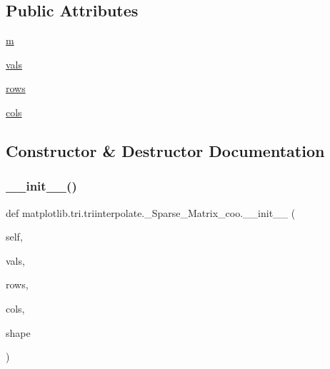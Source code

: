 \subsection*{Public Attributes}
\begin{DoxyCompactItemize}
\item 
\hyperlink{classmatplotlib_1_1tri_1_1triinterpolate_1_1__Sparse__Matrix__coo_aab07df69429ab594960f2091021c09a1}{m}
\item 
\hyperlink{classmatplotlib_1_1tri_1_1triinterpolate_1_1__Sparse__Matrix__coo_a5612eaa0dd35a3b3aa32e70b75caf87e}{vals}
\item 
\hyperlink{classmatplotlib_1_1tri_1_1triinterpolate_1_1__Sparse__Matrix__coo_ab6ab2e1e4113a80306bbe56713e297f8}{rows}
\item 
\hyperlink{classmatplotlib_1_1tri_1_1triinterpolate_1_1__Sparse__Matrix__coo_a9fcf91261546f911c9a1c9f7d00be92b}{cols}
\end{DoxyCompactItemize}


\subsection{Constructor \& Destructor Documentation}
\mbox{\label{classmatplotlib_1_1tri_1_1triinterpolate_1_1__Sparse__Matrix__coo_ad3100094a24d21cce002599ccc71d241}} 
\subsubsection{\texorpdfstring{\+\_\+\+\_\+init\+\_\+\+\_\+()}{\_\_init\_\_()}}
{\footnotesize\ttfamily def matplotlib.\+tri.\+triinterpolate.\+\_\+\+Sparse\+\_\+\+Matrix\+\_\+coo.\+\_\+\+\_\+init\+\_\+\+\_\+ (\begin{DoxyParamCaption}\item[{}]{self,  }\item[{}]{vals,  }\item[{}]{rows,  }\item[{}]{cols,  }\item[{}]{shape }\end{DoxyParamCaption})}

